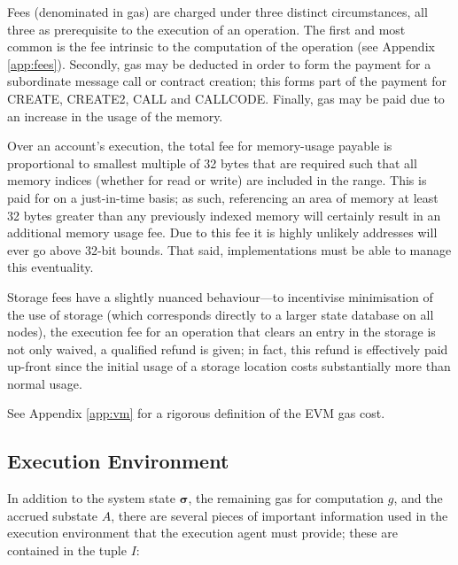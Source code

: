 \documentclass[9pt,oneside]{amsart}
\makeatletter
\newcommand{\linkdest}[1]{\Hy@raisedlink{\hypertarget{#1}{}}}
\makeatother
\begin{document}
\begin{multicols}{2}
Fees (denominated in gas) are charged under three distinct circumstances, all three as prerequisite to the execution of an operation. The first and most common is the fee intrinsic to the computation of the operation (see Appendix \ref{app:fees}). Secondly, gas may be deducted in order to form the payment for a subordinate message call or contract creation; this forms part of the payment for {\small CREATE}, {\small CREATE2}, {\small CALL} and {\small CALLCODE}. Finally, gas may be paid due to an increase in the usage of the memory.

Over an account's execution, the total fee for memory-usage payable is proportional to smallest multiple of 32 bytes that are required such that all memory indices (whether for read or write) are included in the range. This is paid for on a just-in-time basis; as such, referencing an area of memory at least 32 bytes greater than any previously indexed memory will certainly result in an additional memory usage fee. Due to this fee it is highly unlikely addresses will ever go above 32-bit bounds. That said, implementations must be able to manage this eventuality.

Storage fees have a slightly nuanced behaviour---to incentivise minimisation of the use of storage (which corresponds directly to a larger state database on all nodes), the execution fee for an operation that clears an entry in the storage is not only waived, a qualified refund is given; in fact, this refund is effectively paid up-front since the initial usage of a storage location costs substantially more than normal usage.

See Appendix \ref{app:vm} for a rigorous definition of the EVM gas cost.

\subsection{Execution Environment}\linkdest{exec_env}

In addition to the system state $\boldsymbol{\sigma}$, the remaining gas for computation $g$, and the accrued substate $A$,
there are several pieces of important information used in the execution environment that the execution agent must provide; these are contained in the tuple $I$:


\end{multicols}
\end{document}
